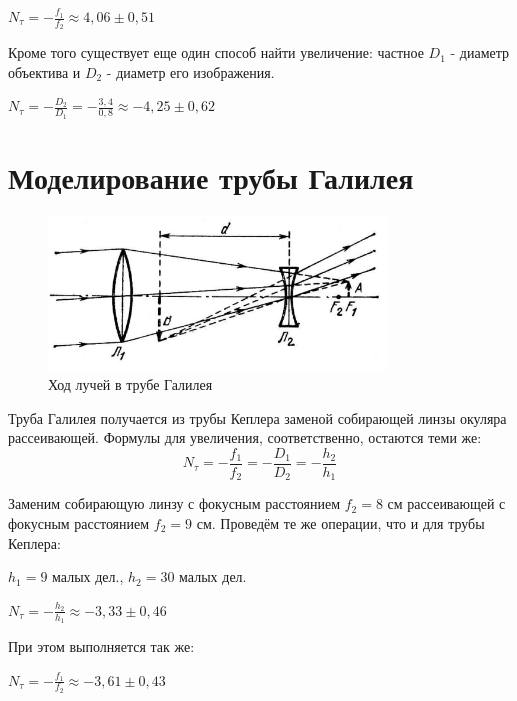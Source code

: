 \documentclass[15pt,a5paper,reqno]{article}
\begin{document}
\begin{center}
    $N_{\tau} = -\frac{f_{1}}{f_2} \approx 4,06 \pm 0,51$
\end{center}

Кроме того существует еще один способ найти увеличение: частное $D_1 $ - диаметр объектива и $D_2$ - диаметр его изображения.

\begin{center}
	$N_{\tau} = -\frac{D_2}{D_1} = -\frac{3,4}{0,8} \approx -4,25 \pm 0,62$
\end{center}



\section{Моделирование трубы Галилея}
    \begin{figure}[h!]
    \centering
    \includegraphics[width=9cm]{pics/gal.png}
    \caption{Ход лучей в трубе Галилея}
    \label{}
\end{figure}

Труба Галилея получается из трубы Кеплера заменой собирающей линзы окуляра рассеивающей. Формулы для увеличения, соответственно, остаются теми же:
\begin{equation}
    N_{\tau} = -\frac{f_1}{f_2} = -\frac{D_1}{D_2} =  -\frac{h_2}{h_1}
\end{equation}


Заменим собирающую линзу с фокусным расстоянием $f_2 = 8$ см рассеивающей с фокусным расстоянием $f_2 = 9$ см. Проведём те же операции, что и для трубы Кеплера:

\begin{center}
$h_1 = 9$ малых дел., \hspace{1cm} $h_2 = 30$ малых дел. \par
$N_{\tau} = -\frac{h_2}{h_1} \approx -3,33 \pm 0,46$
\end{center}

При этом выполняется так же:

\begin{center}
    $N_{\tau} = -\frac{f_1}{f_2} \approx -3,61 \pm 0,43$
\end{center}
\end{document}
